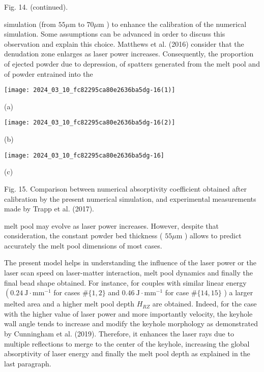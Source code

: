 \documentclass[10pt]{article}
\begin{document}
Fig. 14. (continued).

simulation (from $55 \mu \mathrm{m}$ to $70 \mu \mathrm{m}$ ) to enhance the calibration of the numerical simulation. Some assumptions can be advanced in order to discuss this observation and explain this choice. Matthews et al. (2016) consider that the denudation zone enlarges as laser power increases. Consequently, the proportion of ejected powder due to depression, of spatters generated from the melt pool and of powder entrained into the

\begin{center}
\texttt{[image: 2024\_03\_10\_fc82295ca80e2636ba5dg-16(1)]}
\end{center}

(a)

\begin{center}
\texttt{[image: 2024\_03\_10\_fc82295ca80e2636ba5dg-16(2)]}
\end{center}

(b)

\begin{center}
\texttt{[image: 2024\_03\_10\_fc82295ca80e2636ba5dg-16]}
\end{center}

(c)

Fig. 15. Comparison between numerical absorptivity coefficient obtained after calibration by the present numerical simulation, and experimental measurements made by Trapp et al. (2017).

melt pool may evolve as laser power increases. However, despite that consideration, the constant powder bed thickness ( $55 \mu \mathrm{m}$ ) allows to predict accurately the melt pool dimensions of most cases.

The present model helps in understanding the influence of the laser power or the laser scan speed on laser-matter interaction, melt pool dynamics and finally the final bead shape obtained. For instance, for couples with similar linear energy $\left(0.24 \mathrm{~J} \cdot \mathrm{mm}^{-1}\right.$ for cases $\#\{1,2\}$ and $0.46 \mathrm{~J} \cdot \mathrm{mm}^{-1}$ for case $\#\{14,15\}$ ) a larger melted area and a higher melt pool depth $H_{R Z}$ are obtained. Indeed, for the case with the higher value of laser power and more importantly velocity, the keyhole wall angle tends to increase and modify the keyhole morphology as demonstrated by Cunningham et al. (2019). Therefore, it enhances the laser rays due to multiple reflections to merge to the center of the keyhole, increasing the global absorptivity of laser energy and finally the melt pool depth as explained in the last paragraph.
\end{document}
